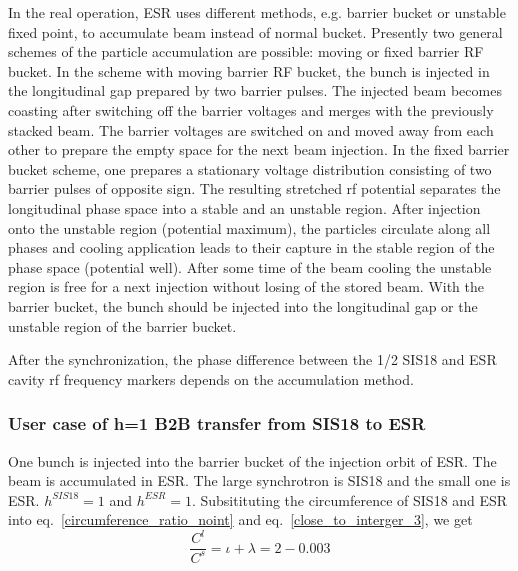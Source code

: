 In the real operation, ESR uses different methods, e.g. barrier bucket or unstable fixed point, to accumulate beam instead of normal bucket.  Presently two general schemes of the particle accumulation are possible: moving or fixed barrier RF bucket. In the scheme with moving barrier RF bucket, the bunch is injected in the longitudinal gap prepared by two barrier pulses. The injected beam becomes coasting after switching off the barrier voltages and merges with
the previously stacked beam. The barrier voltages are switched on and moved away from each other to prepare the empty space for the next beam injection. In the fixed barrier bucket scheme, one prepares a stationary voltage distribution consisting of two barrier pulses of opposite sign. The resulting stretched rf potential separates the longitudinal phase space into a stable and an unstable region. After injection onto the unstable region (potential maximum), the particles circulate along all phases and cooling application leads to their capture in the stable region of the phase space (potential well). After some time of the beam cooling the unstable region is free for a next injection without losing of the stored beam. With the barrier bucket, the bunch should be injected into the longitudinal gap or the unstable region of the barrier bucket.

After the synchronization, the phase difference between the 1/2 SIS18 and ESR cavity rf frequency markers depends on the accumulation method.


\subsubsection{User case of h=1 B2B transfer from SIS18 to ESR} 
One bunch is injected into the barrier bucket of the injection orbit of ESR. The beam is accumulated in ESR. The large synchrotron is SIS18 and the small one is ESR. $h^{SIS18}=1$ and $h^{ESR}=1$. Subsitituting the circumference of SIS18 and ESR into eq.~\ref{circumference_ratio_noint} and eq.~\ref{close_to_interger_3}, we get
\begin{equation}
\frac{C^l}{C^s}=\iota + \lambda =2-0.003
\end{equation}

